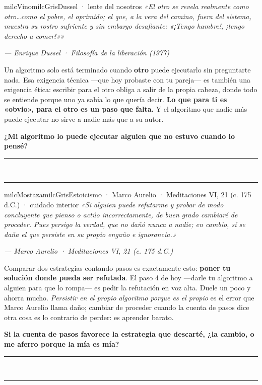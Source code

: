 \documentclass[11pt,letterpaper]{article}
\newcommand{\linead}[1]{\noindent\color{milcLinea}\rule{#1}{0.5pt}\color{milcNegro}}
\begin{document}
\begin{softbox}{milcVino}{milcGris}{Dussel · lente del nosotros}
\textit{«El otro se revela realmente como otro\ldots como el pobre, el oprimido; el que, a la vera del camino, fuera del sistema, muestra su rostro sufriente y sin embargo desafiante: «¡Tengo hambre!, ¡tengo derecho a comer!»»}

{\footnotesize\itshape\color{milcNegro!70}--- Enrique Dussel · Filosofía de la liberación (1977)}

Un algoritmo solo está terminado cuando \textbf{otro} puede ejecutarlo sin preguntarte nada. Esa exigencia técnica ---que hoy probaste con tu pareja--- es también una exigencia ética: escribir para el otro obliga a salir de la propia cabeza, donde todo se entiende porque uno ya sabía lo que quería decir. \textbf{Lo que para ti es «obvio», para el otro es un paso que falta.} Y el algoritmo que nadie más puede ejecutar no sirve a nadie más que a su autor.

\textbf{¿Mi algoritmo lo puede ejecutar alguien que no estuvo cuando lo pensé?}
\end{softbox}
\linead{\linewidth}\\[1mm]
\linead{\linewidth}

\begin{softbox}{milcMostaza}{milcGris}{Estoicismo · Marco Aurelio · Meditaciones VI, 21 (c. 175 d.C.) · cuidado interior}
\textit{«Si alguien puede refutarme y probar de modo concluyente que pienso o actúo incorrectamente, de buen grado cambiaré de proceder. Pues persigo la verdad, que no dañó nunca a nadie; en cambio, sí se daña el que persiste en su propio engaño e ignorancia.»}

{\footnotesize\itshape\color{milcNegro!70}--- Marco Aurelio · Meditaciones VI, 21 (c. 175 d.C.)}

Comparar dos estrategias contando pasos es exactamente esto: \textbf{poner tu solución donde pueda ser refutada}. El paso 4 de hoy ---darle tu algoritmo a alguien para que lo rompa--- es pedir la refutación en voz alta. Duele un poco y ahorra mucho. \emph{Persistir en el propio algoritmo porque es el propio} es el error que Marco Aurelio llama daño; cambiar de proceder cuando la cuenta de pasos dice otra cosa es lo contrario de perder: es aprender barato.

\textbf{Si la cuenta de pasos favorece la estrategia que descarté, ¿la cambio, o me aferro porque la mía es mía?}
\end{softbox}
\linead{\linewidth}\\[1mm]
\linead{\linewidth}
\end{document}
